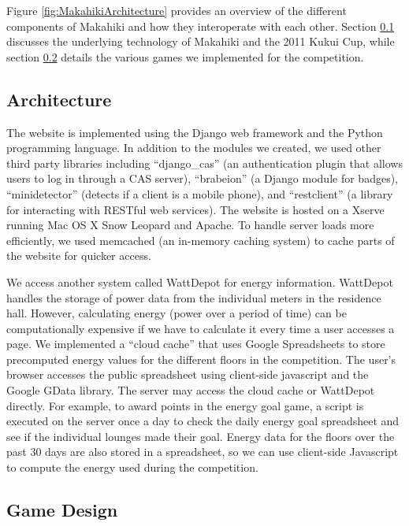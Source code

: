 \documentclass{acm_proc_article-sp}
\begin{document}
Figure \ref{fig:MakahikiArchitecture} provides an overview of the different components of Makahiki and how they interoperate with each other. Section \ref{sys:Architecture} discusses the underlying technology of Makahiki and the 2011 Kukui Cup, while section \ref{sys:GameDesign} details the various games we implemented for the competition.

\subsection{Architecture}
\label{sys:Architecture}

The website is implemented using the Django web framework and the Python programming language. In addition to the modules we created, we used other third party libraries including ``django\_cas'' (an authentication plugin that allows users to log in through a CAS server), ``brabeion'' (a Django module for badges), ``minidetector'' (detects if a client is a mobile phone), and ``restclient'' (a library for interacting with RESTful web services). The website is hosted on a Xserve running Mac OS X Snow Leopard and Apache. To handle server loads more efficiently, we used memcached (an in-memory caching system) to cache parts of the website for quicker access.

We access another system called WattDepot for energy information.  WattDepot handles the storage of power data from the individual meters in the residence hall. However, calculating energy (power over a period of time) can be computationally expensive if we have to calculate it every time a user accesses a page. We implemented a ``cloud cache'' that uses Google Spreadsheets to store precomputed energy values for the different floors in the competition. The user's browser accesses the public spreadsheet using client-side javascript and the Google GData library. The server may access the cloud cache or WattDepot directly. For example, to award points in the energy goal game, a script is executed on the server once a day to check the daily energy goal spreadsheet and see if the individual lounges made their goal. Energy data for the floors over the past 30 days are also stored in a spreadsheet, so we can use client-side Javascript to compute the energy used during the competition.

\subsection{Game Design}
\label{sys:GameDesign}
\end{document}
